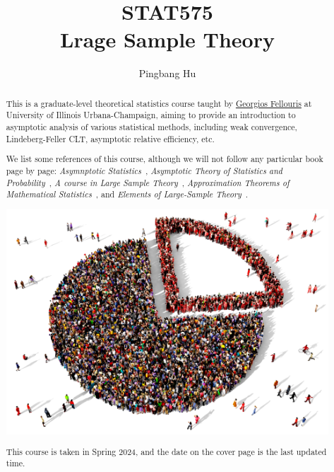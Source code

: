 \documentclass[a4paper]{report}
\author{Pingbang Hu}
\title{STAT575\\Lrage Sample Theory}
\begin{document}
\maketitle

\begin{abstract}
	This is a graduate-level theoretical statistics course taught by \href{https://publish.illinois.edu/fellouri/}{Georgios Fellouris} at University of Illinois Urbana-Champaign, aiming to provide an introduction to asymptotic analysis of various statistical methods, including weak convergence, Lindeberg-Feller CLT, asymptotic relative efficiency, etc.

	We list some references of this course, although we will not follow any particular book page by page: \emph{Asymnptotic Statistics}~\cite{vaartAsymptoticStatistics1998}, \emph{Asymptotic Theory of Statistics and Probability}~\cite{dasguptaAsymptoticTheoryStatistics2008}, \emph{A course in Large Sample Theory}~\cite{fergusonCourseLargeSample2017}, \emph{Approximation Theorems of Mathematical Statistics}~\cite{serflingApproximationTheoremsMathematical2009}, and \emph{Elements of Large-Sample Theory}~\cite{lehmannElementsLargeSampleTheory2004}.

	\vfill
	\begin{center}
		\includegraphics[width=.8\linewidth]{Figures/cover.png}
	\end{center}
	\vfill
	This course is taken in Spring 2024, and the date on the cover page is the last updated time.
\end{abstract}

\tableofcontents


\newpage
\appendix
\appendixpage{}



\newpage
\printbibliography{}
\end{document}
